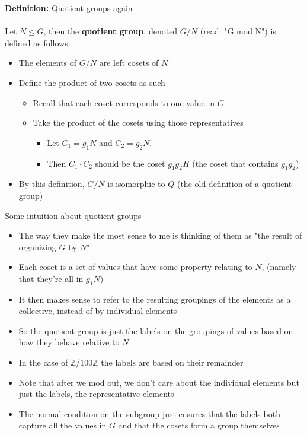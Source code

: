 \documentclass{article}
\newcommand{\Z}{\mathbb{Z}}
\begin{document}
\begin{definition} 
\textbf{Definition:} Quotient groups again \\
~\\
Let $N\trianglelefteq G$, then the {\color{blue} \textbf{quotient group}}, denoted $G /N$ (read: "G mod N") is defined as follows
\begin{itemize}
	\item The elements of $G /N$ are left cosets of $N$
	\item Define the product of two cosets as such
	\begin{itemize}
		\item Recall that each coset corresponds to one value in $G$
		\item Take the product of the cosets using those representatives
		\begin{itemize}
			\item Let $C_1 = g_1N$ and $C_2 = g_2N$. 
			\item Then $C_1 \cdot C_2$ should be the coset $g_1g_2H$ (the coset that contains $g_1g_2$)
		\end{itemize}
	\end{itemize}
\item By this definition, $G/ N$ is isomorphic to $Q$ (the old definition of a quotient group)
\end{itemize}
\end{definition}
Some intuition about quotient groups
\begin{itemize}
	\item The way they make the most sense to me is thinking of them as "the result of organizing $G$ by $N$"
	\item Each coset is a set of values that have some property relating to $N$, (namely that they're all in $g_1N$)
	\item It then makes sense to refer to the resulting groupings of the elements as a collective, instead of by individual elements
	\item So the quotient group is just the labels on the groupings of values based on how they behave relative to $N$
	\item In the case of $\Z /100\Z$ the labels are based on their remainder
	\item Note that after we mod out, we don't care about the individual elements but just the labels, the representative elements
	\item The normal condition on the subgroup just ensures that the labels both capture all the values in $G$ and that the cosets form a group themselves
\end{itemize}
\end{document}
